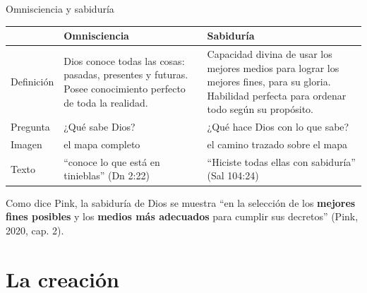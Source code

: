 \documentclass[hyperref={bookmarks=false},aspectratio=169]{beamer}
\newcommand{\destacar}[1]{\textbf{\textcolor{azul}{#1}}}
\begin{document}
\begin{frame}{Omnisciencia y sabiduría}
\scriptsize\renewcommand{\arraystretch}{1.25}
\begin{tabular}{@{}>{\RaggedRight\arraybackslash}p{2.0cm}>{\RaggedRight\arraybackslash}p{4.9cm}>{\RaggedRight\arraybackslash}p{4.9cm}@{}}
\toprule
 & \textbf{Omnisciencia} & \textbf{Sabiduría} \\ \midrule
Definición & Dios conoce todas las cosas: pasadas, presentes y futuras. Posee conocimiento perfecto de toda la realidad. & Capacidad divina de usar los mejores medios para lograr los mejores fines, para su gloria. Habilidad perfecta para ordenar todo según su propósito. \\
Pregunta & ¿Qué sabe Dios? & ¿Qué hace Dios con lo que sabe? \\
Imagen & el mapa completo & el camino trazado sobre el mapa \\
Texto & ``conoce lo que está en tinieblas'' (Dn 2:22) & ``Hiciste todas ellas con sabiduría'' (Sal 104:24) \\
\bottomrule
\end{tabular}\par\medskip
\begin{tcolorbox}[colback=papiro,colframe=dorado,boxrule=1.2pt,arc=3pt]
\centering\small Como dice Pink, la sabiduría de Dios se muestra ``en la selección de los \destacar{mejores fines posibles} y los \destacar{medios más adecuados} para cumplir sus decretos'' (Pink, 2020, cap. 2).
\end{tcolorbox}
\end{frame}

\section{La creación}
\end{document}
